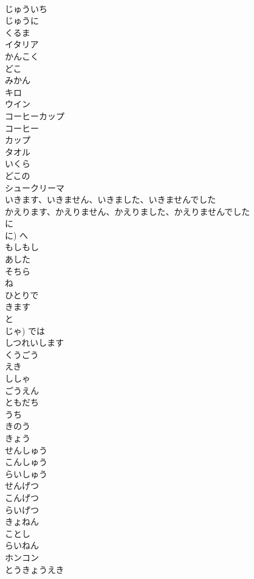 \documentclass[8pt]{extreport}
\begin{document}
\begin{CJK}{UTF8}{min}
\\	じゅういち		
\\	じゅうに		
\\	くるま		
\\	イタリア		
\\	かんこく		
\\	どこ		
\\	みかん		
\\	キロ		
\\	ウイン		
\\	コーヒーカップ		
\\	コーヒー		
\\	カップ		
\\	タオル		
\\	いくら		
\\	どこの		
\\	シュークリーマ		
\\	いきます、いきません、いきました、いきませんでした		
\\	かえります、かえりません、かえりました、かえりませんでした		
\\	に		
\\	に)	へ	
\\	もしもし		
\\	あした		
\\	そちら		
\\	ね		
\\	ひとりで		
\\	きます		
\\	と		
\\	じゃ)	では		
\\	しつれいします		
\\	くうごう		
\\	えき		
\\	ししゃ		
\\	ごうえん		
\\	ともだち		
\\	うち		
\\	きのう		
\\	きょう		
\\	せんしゅう		
\\	こんしゅう		
\\	らいしゅう		
\\	せんげつ		
\\	こんげつ		
\\	らいげつ		
\\	きょねん		
\\	ことし		
\\	らいねん		
\\	ホンコン		
\\	とうきょうえき		

\end{CJK}
\end{document}
